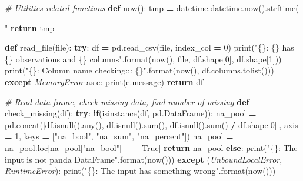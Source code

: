 \documentclass[]{book}
\newenvironment{Shaded}{\begin{snugshade}}{\end{snugshade}}
\newcommand{\KeywordTok}[1]{\textcolor[rgb]{0.13,0.29,0.53}{\textbf{#1}}}
\newcommand{\DecValTok}[1]{\textcolor[rgb]{0.00,0.00,0.81}{#1}}
\newcommand{\SpecialCharTok}[1]{\textcolor[rgb]{0.00,0.00,0.00}{#1}}
\newcommand{\StringTok}[1]{\textcolor[rgb]{0.31,0.60,0.02}{#1}}
\newcommand{\ImportTok}[1]{#1}
\newcommand{\CommentTok}[1]{\textcolor[rgb]{0.56,0.35,0.01}{\textit{#1}}}
\newcommand{\VariableTok}[1]{\textcolor[rgb]{0.00,0.00,0.00}{#1}}
\newcommand{\ControlFlowTok}[1]{\textcolor[rgb]{0.13,0.29,0.53}{\textbf{#1}}}
\newcommand{\OperatorTok}[1]{\textcolor[rgb]{0.81,0.36,0.00}{\textbf{#1}}}
\newcommand{\BuiltInTok}[1]{#1}
\newcommand{\PreprocessorTok}[1]{\textcolor[rgb]{0.56,0.35,0.01}{\textit{#1}}}
\newcommand{\NormalTok}[1]{#1}
\begin{document}
\begin{Shaded}
\begin{Highlighting}[]
\CommentTok{# Utilities-related functions}
\KeywordTok{def}\NormalTok{ now():}
\NormalTok{    tmp }\OperatorTok{=}\NormalTok{ datetime.datetime.now().strftime(}\StringTok{"%
    \ControlFlowTok{return}\NormalTok{ tmp}

\KeywordTok{def}\NormalTok{ read_file(}\BuiltInTok{file}\NormalTok{):}
    \ControlFlowTok{try}\NormalTok{:}
\NormalTok{        df }\OperatorTok{=}\NormalTok{ pd.read_csv(}\BuiltInTok{file}\NormalTok{, index_col }\OperatorTok{=} \DecValTok{0}\NormalTok{)}
        \BuiltInTok{print}\NormalTok{(}\StringTok{"}\SpecialCharTok{\{\}}\StringTok{: }\SpecialCharTok{\{\}}\StringTok{ has }\SpecialCharTok{\{\}}\StringTok{ observations and }\SpecialCharTok{\{\}}\StringTok{ columns"}\NormalTok{.}\BuiltInTok{format}\NormalTok{(now(), }\BuiltInTok{file}\NormalTok{, df.shape[}\DecValTok{0}\NormalTok{], df.shape[}\DecValTok{1}\NormalTok{]))}
        \BuiltInTok{print}\NormalTok{(}\StringTok{"}\SpecialCharTok{\{\}}\StringTok{: Column name checking::: }\SpecialCharTok{\{\}}\StringTok{"}\NormalTok{.}\BuiltInTok{format}\NormalTok{(now(), df.columns.tolist()))}
    \ControlFlowTok{except} \PreprocessorTok{MemoryError} \ImportTok{as}\NormalTok{ e:}
        \BuiltInTok{print}\NormalTok{(e.message)}
    \ControlFlowTok{return}\NormalTok{ df}

\CommentTok{# Read data frame, check missing data, find number of missing}
\KeywordTok{def}\NormalTok{ check_missing(df):}
    \ControlFlowTok{try}\NormalTok{:}
        \ControlFlowTok{if}\NormalTok{(}\BuiltInTok{isinstance}\NormalTok{(df, pd.DataFrame)):}
\NormalTok{            na_pool }\OperatorTok{=}\NormalTok{ pd.concat([df.isnull().}\BuiltInTok{any}\NormalTok{(), df.isnull().}\BuiltInTok{sum}\NormalTok{(), df.isnull().}\BuiltInTok{sum}\NormalTok{() }\OperatorTok{/}\NormalTok{ df.shape[}\DecValTok{0}\NormalTok{]], axis }\OperatorTok{=} \DecValTok{1}\NormalTok{, keys }\OperatorTok{=}\NormalTok{ [}\StringTok{"na_bool"}\NormalTok{, }\StringTok{"na_sum"}\NormalTok{, }\StringTok{"na_percent"}\NormalTok{])}
\NormalTok{            na_pool }\OperatorTok{=}\NormalTok{ na_pool.loc[na_pool[}\StringTok{"na_bool"}\NormalTok{] }\OperatorTok{==}  \VariableTok{True}\NormalTok{]}
            \ControlFlowTok{return}\NormalTok{ na_pool}
        \ControlFlowTok{else}\NormalTok{:}
            \BuiltInTok{print}\NormalTok{(}\StringTok{"}\SpecialCharTok{\{\}}\StringTok{: The input is not panda DataFrame"}\NormalTok{.}\BuiltInTok{format}\NormalTok{(now()))}
    \ControlFlowTok{except}\NormalTok{ (}\PreprocessorTok{UnboundLocalError}\NormalTok{, }\PreprocessorTok{RuntimeError}\NormalTok{):}
        \BuiltInTok{print}\NormalTok{(}\StringTok{"}\SpecialCharTok{\{\}}\StringTok{: The input has something wrong"}\NormalTok{.}\BuiltInTok{format}\NormalTok{(now()))}

}
\end{Highlighting}
\end{Shaded}
\end{document}
